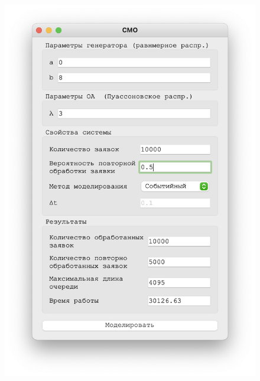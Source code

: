  \begin{figure}[!htb]
    \begin{minipage}{0.55\textwidth}
      \centering
      \includegraphics[width=1\linewidth]{3-50-s}
    \end{minipage}\hfill
    \begin{minipage}{0.55\textwidth}
      \centering

\end{minipage}
\end{figure}
